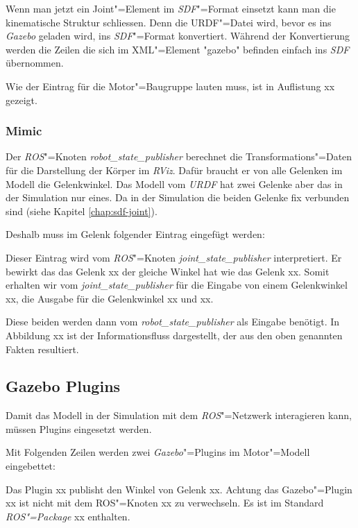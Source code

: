 Wenn man jetzt ein Joint"=Element im \textit{SDF}"=Format einsetzt kann man die kinematische Struktur schliessen.
Denn die {URDF}"=Datei wird, bevor es ins \textit{Gazebo} geladen wird, ins \textit{SDF}"=Format konvertiert.
Während der Konvertierung werden die Zeilen die sich im XML"=Element \textsc{"}gazebo\textsc{"} befinden einfach ins \textit{SDF} übernommen.

Wie der Eintrag für die Motor"=Baugruppe lauten muss, ist in Auflistung xx gezeigt.

\subsubsection{Mimic}
\label{chap:mimic}
Der \textit{ROS}"=Knoten \textit{robot\_state\_publisher} berechnet die Transformations"=Daten für die Darstellung der Körper im \textit{RViz}.
Dafür braucht er von alle Gelenken im Modell die Gelenkwinkel.
Das Modell vom \textit{URDF} hat zwei Gelenke aber das in der Simulation nur eines.
Da in der Simulation die beiden Gelenke fix verbunden sind (siehe Kapitel \ref{chap:sdf-joint}).

Deshalb muss im Gelenk folgender Eintrag eingefügt werden: %

Dieser Eintrag wird vom \textit{ROS}"=Knoten \textit{joint\_state\_publisher} interpretiert.
Er bewirkt das das Gelenk xx der gleiche Winkel hat wie das Gelenk xx.
Somit erhalten wir vom \textit{joint\_state\_publisher} für die Eingabe von einem Gelenkwinkel xx, die Ausgabe für die Gelenkwinkel xx und xx.

Diese beiden werden dann vom \textit{robot\_state\_publisher} als Eingabe benötigt.
In Abbildung xx ist der Informationsfluss dargestellt, der aus den oben genannten Fakten resultiert.

\subsection{Gazebo Plugins}
Damit das Modell in der Simulation mit dem \textit{ROS}"=Netzwerk interagieren kann, müssen Plugins eingesetzt werden.

Mit Folgenden Zeilen werden zwei \textit{Gazebo}"=Plugins im Motor"=Modell eingebettet:

Das Plugin xx publisht den Winkel von Gelenk xx.
Achtung das Gazebo"=Plugin xx ist nicht mit dem ROS"=Knoten xx zu verwechseln.
Es ist im Standard \textit{ROS"=Package} xx enthalten.

